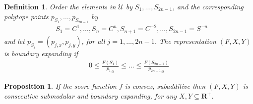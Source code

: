 \documentclass{article}
\newtheorem{definition}{Definition}
\newtheorem{prop}{Proposition}
\theoremstyle{case}
\begin{document}
\begin{definition}
Order the elements in $\mathcal{U}$ by $S_1, \dots, S_{2n-1}$, and the corresponding polytope points $p_{S_1}, \dots, p_{S_{2n-1}}$ by 
\begin{align*}
& S_1 = C^1, \dots, S_n = C^n, S_{n+1} = C^{-2}, \dots, S_{2n-1} = S^{-n}
\end{align*}
and let $p_{S_j} = (p_{j,x}, p_{j,y})$, for all $j = 1, \dots, 2n-1$. 
The representation $(F, X, Y)$ is boundary expanding if 
\begin{align*}
0 \leq \frac{F(S_1)}{p_{1,y}} \leq \dots \leq \frac{F(S_{2n-1})}{p_{2n-1,y}} 
\end{align*}

\end{definition}
\begin{prop}
If the score function $f$ is convex, subadditive then $(F,X,Y)$ is consecutive submodular and boundary expanding, for any $X, Y \subseteq \mathbf{R}^+$.
\end{prop}
\end{document}
